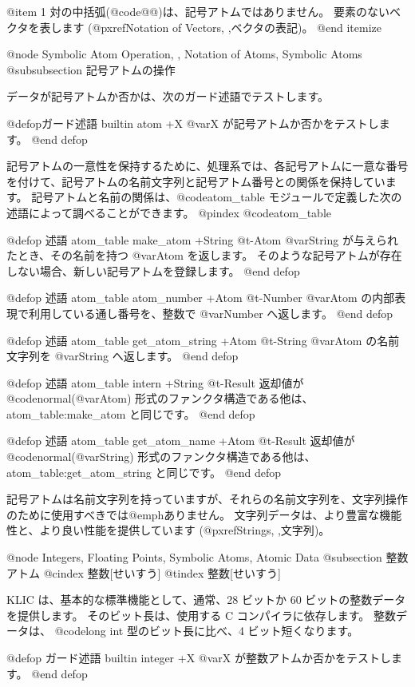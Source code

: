 {{@item 
 1 対の中括弧(@code{@{@}})は、記号アトムではありません。
要素のないベクタを表します
(@pxref{Notation of Vectors, ,ベクタの表記})。
@end itemize

@node Symbolic Atom Operation,  , Notation of Atoms, Symbolic Atoms
@subsubsection 記号アトムの操作

データが記号アトムか否かは、次のガード述語でテストします。

@defop{ガード述語} {builtin} atom +X 
@var{X} が記号アトムか否かをテストします。
@end defop  

記号アトムの一意性を保持するために、処理系では、各記号アトムに一意な番号を付けて、記号アトムの名前文字列と記号アトム番号との関係を保持しています。
記号アトムと名前の関係は、@code{atom_table} モジュールで定義した次の述語によって調べることができます。
@pindex @code{atom_table}

@defop {述語} {atom_table} make_atom +String @t{-}Atom
@var{String} が与えられたとき、その名前を持つ @var{Atom} を返します。
そのような記号アトムが存在しない場合、新しい記号アトムを登録します。
@end defop 

@defop {述語} {atom_table} atom_number +Atom @t{-}Number
@var{Atom} の内部表現で利用している通し番号を、整数で @var{Number} へ返します。
@end defop 

@defop {述語} {atom_table} get_atom_string +Atom @t{-}String
@var{Atom} の名前文字列を @var{String} へ返します。
@end defop  

@defop {述語} {atom_table} intern +String @t{-}Result
返却値が @code{normal(@var{Atom})} 形式のファンクタ構造である他は、atom_table:make_atom と同じです。
@end defop

@defop {述語} {atom_table} get_atom_name +Atom @t{-}Result
返却値が @code{normal(@var{String})} 形式のファンクタ構造である他は、atom_table:get_atom_string と同じです。
@end defop  

記号アトムは名前文字列を持っていますが、それらの名前文字列を、文字列操作のために使用すべきでは@emph{ありません}。
文字列データは、より豊富な機能性と、より良い性能を提供しています
(@pxref{Strings, ,文字列})。

@node Integers, Floating Points, Symbolic Atoms, Atomic Data
@subsection 整数アトム
@cindex 整数[せいすう]
@tindex 整数[せいすう]

KLIC は、基本的な標準機能として、通常、28 ビットか 60 ビットの整数データを提供します。
そのビット長は、使用する C コンパイラに依存します。 
整数データは、 @code{long int} 型のビット長に比べ、4 ビット短くなります。

@defop {ガード述語} {builtin} integer +X
@var{X} が整数アトムか否かをテストします。
@end defop  

}}
